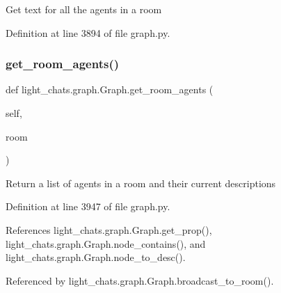 \begin{DoxyVerb}Get text for all the agents in a room\end{DoxyVerb}
 

Definition at line 3894 of file graph.\+py.

\mbox{\label{classlight__chats_1_1graph_1_1Graph_a6e638e9bda7cd6e0f6d964d02a22dec6}} 
\subsubsection{\texorpdfstring{get\+\_\+room\+\_\+agents()}{get\_room\_agents()}}
{\footnotesize\ttfamily def light\+\_\+chats.\+graph.\+Graph.\+get\+\_\+room\+\_\+agents (\begin{DoxyParamCaption}\item[{}]{self,  }\item[{}]{room }\end{DoxyParamCaption})}

\begin{DoxyVerb}Return a list of agents in a room and their current descriptions\end{DoxyVerb}
 

Definition at line 3947 of file graph.\+py.



References light\+\_\+chats.\+graph.\+Graph.\+get\+\_\+prop(), light\+\_\+chats.\+graph.\+Graph.\+node\+\_\+contains(), and light\+\_\+chats.\+graph.\+Graph.\+node\+\_\+to\+\_\+desc().



Referenced by light\+\_\+chats.\+graph.\+Graph.\+broadcast\+\_\+to\+\_\+room().

